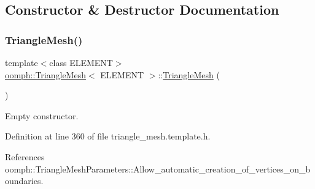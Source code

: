 \subsection{Constructor \& Destructor Documentation}
\mbox{\label{classoomph_1_1TriangleMesh_aec6b165889c9e65820d74837c237b7c7}} 
\subsubsection{\texorpdfstring{Triangle\+Mesh()}{TriangleMesh()}\hspace{0.1cm}{\footnotesize\ttfamily [1/5]}}
{\footnotesize\ttfamily template$<$class E\+L\+E\+M\+E\+NT$>$ \\
\hyperlink{classoomph_1_1TriangleMesh}{oomph\+::\+Triangle\+Mesh}$<$ E\+L\+E\+M\+E\+NT $>$\+::\hyperlink{classoomph_1_1TriangleMesh}{Triangle\+Mesh} (\begin{DoxyParamCaption}{ }\end{DoxyParamCaption})\hspace{0.3cm}{\ttfamily [inline]}}



Empty constructor. 



Definition at line 360 of file triangle\+\_\+mesh.\+template.\+h.



References oomph\+::\+Triangle\+Mesh\+Parameters\+::\+Allow\+\_\+automatic\+\_\+creation\+\_\+of\+\_\+vertices\+\_\+on\+\_\+boundaries.

\mbox{\label{classoomph_1_1TriangleMesh_acb4a658f29866da64cfd31daa98827dc}} 
